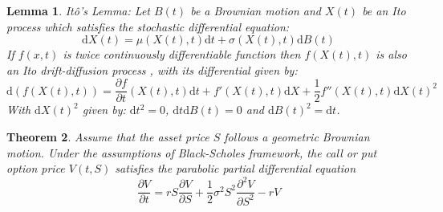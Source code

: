 \documentclass[12pt, oneside]{book}
\theoremstyle{plain}
\newtheorem{theorem}{Theorem}[section]
\newtheorem{lemma}[theorem]{Lemma}
\theoremstyle{definition}
\begin{document}
\begin{lemma} It\^{o}'s Lemma:
Let $B(t)$ be a Brownian motion and $X(t)$ be an Ito process which satisfies the stochastic differential equation:
\begin{equation}
\mathrm{d} X(t) = \mu(X(t),t)\mathrm{d} t + \sigma(X(t),t) \mathrm{d} B(t)
\end{equation} 
If $f(x, t)$ is twice continuously differentiable function then $f(X(t),t)$ is also an Ito drift-diffusion process \cite{klebaner}, with its differential given by:
\begin{equation}
\mathrm{d}(f(X(t),t)) = \frac{\partial f}{\partial t}(X(t),t)\mathrm{d}t + f'(X(t),t)\mathrm{d}X + \frac{1}{2}f''(X(t),t)\mathrm{d} X(t)^2
\end{equation} 
With $ \mathrm{d} X(t)^2$ given by: $ \mathrm{d}t^2 = 0$, $\mathrm{d}t \mathrm{d}B(t) = 0$ and $\mathrm{d}B(t)^2 = \mathrm{d}t$.
\end{lemma}

\begin{theorem}
Assume that the asset price $S$ follows a geometric Brownian motion.  Under the assumptions of Black-Scholes framework, the call or put option price $V(t,S)$ satisfies the parabolic partial differential equation
\begin{equation}
\frac{\partial V}{\partial t} = rS\frac{\partial V}{\partial S}+\frac{1}{2} \sigma^2 S^2 \frac{\partial^2 V}{\partial S^2} - rV
\end{equation}
\end{theorem}
\end{document}
